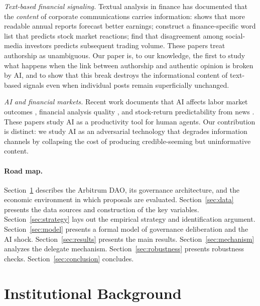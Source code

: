 \documentclass[12pt]{article}
\begin{document}
\emph{Text-based financial signaling.} Textual analysis in finance has documented that the \emph{content} of corporate communications carries information: \citet{li2008} shows that more readable annual reports forecast better earnings; \citet{loughran2011} construct a finance-specific word list that predicts stock market reactions; \citet{cookson2020} find that disagreement among social-media investors predicts subsequent trading volume. These papers treat authorship as unambiguous. Our paper is, to our knowledge, the first to study what happens when the link between authorship and authentic opinion is broken by AI, and to show that this break destroys the informational content of text-based signals even when individual posts remain superficially unchanged.

\emph{AI and financial markets.} Recent work documents that AI affects labor market outcomes \citep{brynjolfsson2023, eisfeldt2023}, financial analysis quality \citep{cao2023, kim2024}, and stock-return predictability from news \citep{lopezlira2023}. These papers study AI as a productivity tool for human agents. Our contribution is distinct: we study AI as an adversarial technology that degrades information channels by collapsing the cost of producing credible-seeming but uninformative content.

\paragraph{Road map.} Section~\ref{sec:background} describes the Arbitrum DAO,
its governance architecture, and the economic environment in which proposals are
evaluated. Section~\ref{sec:data} presents the data sources and construction of
the key variables. Section~\ref{sec:strategy} lays out the empirical strategy and
identification argument. Section~\ref{sec:model} presents a formal model of governance deliberation and the AI shock. Section~\ref{sec:results} presents the main results.
Section~\ref{sec:mechanism} analyzes the delegate mechanism. Section~\ref{sec:robustness}
presents robustness checks. Section~\ref{sec:conclusion} concludes.



\section{Institutional Background}
\label{sec:background}

\end{document}
